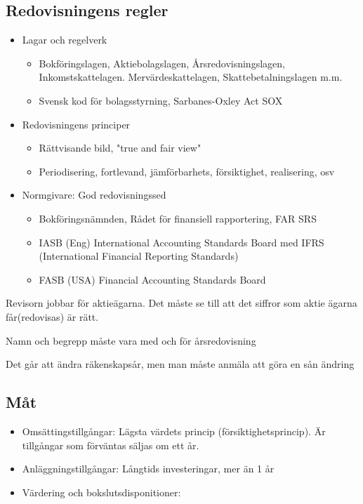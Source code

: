\subsection{Redovisningens regler}
\begin{itemize}
    \item Lagar och regelverk
    \begin{itemize}
        \item Bokföringslagen, Aktiebolagslagen, Årsredovisningslagen, Inkomstskattelagen.
        Mervärdeskattelagen, Skattebetalningslagen m.m.
        \item Svensk kod för bolagsstyrning, Sarbanes-Oxley Act SOX 
    \end{itemize}
    \item Redovisningens principer
    \begin{itemize}
        \item Rättvisande bild, "true and fair view"
        \item Periodisering, fortlevand, jämförbarhets, försiktighet, realisering, osv
    \end{itemize}
    \item Normgivare: God redovisningssed
    \begin{itemize}
        \item Bokföringsnämnden, Rådet för finansiell rapportering, FAR SRS 
        \item IASB (Eng) International Accounting Standards Board med IFRS (International Financial Reporting Standards)
        \item FASB (USA) Financial Accounting Standards Board
    \end{itemize}
\end{itemize}

Revisorn jobbar för aktieägarna. Det måste se till att det siffror som aktie ägarna får(redovisas) 
är rätt.

Namn och begrepp måste vara med och för årsredovisning

Det går att ändra räkenskapsår, men man måste anmäla att göra en sån ändring


\subsection{Måt}
\begin{itemize}
    \item Omsättingstillgångar: Lägsta värdets princip (försiktighetsprincip). Är tillgångar som förväntas säljas om ett år.
    \item Anläggningstillgångar: Långtids investeringar, mer än 1 år
    \item Värdering och bokslutsdisponitioner: %
\end{itemize}

